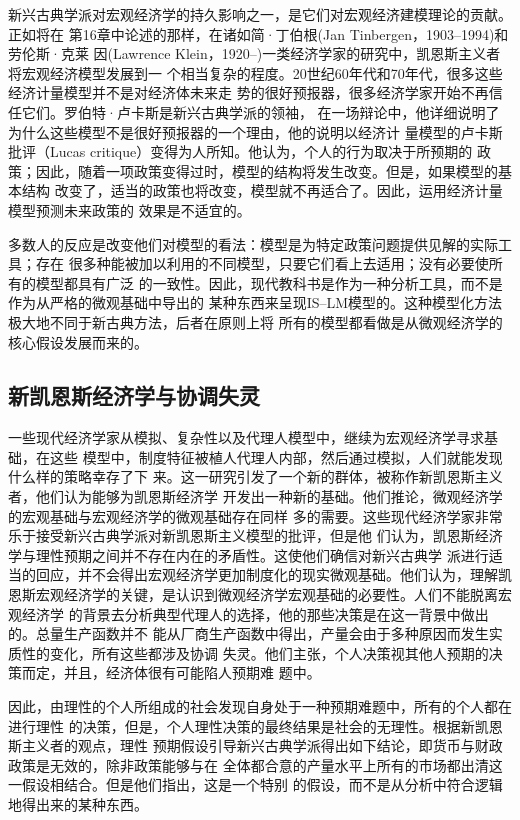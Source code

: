 新兴古典学派对宏观经济学的持久影响之一，是它们对宏观经济建模理论的贡献。正如将在
第16章中论述的那样，在诸如简·丁伯根(Jan Tinbergen，1903--1994)和劳伦斯·克莱
因(Lawrence Klein，1920--)一类经济学家的研究中，凯恩斯主义者将宏观经济模型发展到一
个相当复杂的程度。20世纪60年代和70年代，很多这些经济计量模型并不是对经济体未来走
势的很好预报器，很多经济学家开始不再信任它们。罗伯特·卢卡斯是新兴古典学派的领袖，
在一场辩论中，他详细说明了为什么这些模型不是很好预报器的一个理由，他的说明以经济计
量模型的卢卡斯批评（Lucas critique）变得为人所知。他认为，个人的行为取决于所预期的
政策；因此，随着一项政策变得过时，模型的结构将发生改变。但是，如果模型的基本结构
改变了，适当的政策也将改变，模型就不再适合了。因此，运用经济计量模型预测未来政策的
效果是不适宜的。

多数人的反应是改变他们对模型的看法：模型是为特定政策问题提供见解的实际工具；存在
很多种能被加以利用的不同模型，只要它们看上去适用；没有必要使所有的模型都具有广泛
的一致性。因此，现代教科书是作为一种分析工具，而不是作为从严格的微观基础中导出的
某种东西来呈现IS--LM模型的。这种模型化方法极大地不同于新古典方法，后者在原则上将
所有的模型都看做是从微观经济学的核心假设发展而来的。

\subsection{新凯恩斯经济学与协调失灵}

一些现代经济学家从模拟、复杂性以及代理人模型中，继续为宏观经济学寻求基础，在这些
模型中，制度特征被植人代理人内部，然后通过模拟，人们就能发现什么样的策略幸存了下
来。这一研究引发了一个新的群体，被称作新凯恩斯主义者，他们认为能够为凯恩斯经济学
开发出一种新的基础。他们推论，微观经济学的宏观基础与宏观经济学的微观基础存在同样
多的需要。这些现代经济学家非常乐于接受新兴古典学派对新凯恩斯主义模型的批评，但是他
们认为，凯恩斯经济学与理性预期之间并不存在内在的矛盾性。这使他们确信对新兴古典学
派进行适当的回应，并不会得出宏观经济学更加制度化的现实微观基础。他们认为，理解凯
恩斯宏观经济学的关键，是认识到微观经济学宏观基础的必要性。人们不能脱离宏观经济学
的背景去分析典型代理人的选择，他的那些决策是在这一背景中做出的。总量生产函数并不
能从厂商生产函数中得出，产量会由于多种原因而发生实质性的变化，所有这些都涉及协调
失灵。他们主张，个人决策视其他人预期的决策而定，并且，经济体很有可能陷人预期难
题中。

因此，由理性的个人所组成的社会发现自身处于一种预期难题中，所有的个人都在进行理性
的决策，但是，个人理性决策的最终结果是社会的无理性。根据新凯恩斯主义者的观点，理性
预期假设引导新兴古典学派得出如下结论，即货币与财政政策是无效的，除非政策能够与在
全体都合意的产量水平上所有的市场都出清这一假设相结合。但是他们指出，这是一个特别
的假设，而不是从分析中符合逻辑地得出来的某种东西。

